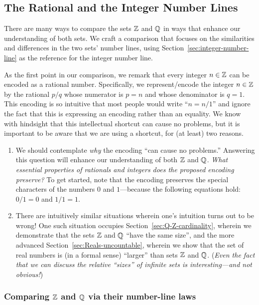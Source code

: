 \subsection{The Rational and the Integer Number Lines}
\label{sec:Compare-Q-Z}

There are many ways to compare the sets $\mathbb{Z}$ and $\mathbb{Q}$ in ways that
enhance our understanding of both sets.  We craft a comparison that
focuses on the similarities and differences in the two sets' number
lines, using Section~\ref{sec:integer-number-line} as the reference
for the integer number line.

As the first point in our comparison, we remark that every integer $n
\in \mathbb{Z}$ can be encoded as a rational 
number.  Specifically, we represent/encode the integer $n \in \mathbb{Z}$ by
the rational $p/q$ whose numerator is $p = n$ and whose denominator is
$q = 1$.  This encoding is so intuitive that most people would write
``$n = n/1$'' and ignore the fact that this is expressing an encoding
rather than an equality.  We know with hindsight that this
intellectual shortcut can cause no problems, but it is important to be
aware that we are using a shortcut, for (at least) two reasons.
\begin{enumerate}
\item
We should contemplate {\em why} the encoding ``can cause no
problems.''  Answering this question will enhance our understanding of
both $\mathbb{Z}$ and $\mathbb{Q}$.  {\em What essential properties of rationals and
  integers does the proposed encoding preserve?}  To get started, note
that the encoding preserves the special characters of the numbers $0$
and $1$---because the following equations hold: $0/1 = 0$ and $1/1 =
1$.

\item
There are intuitively similar situations wherein one's intuition turns
out to be wrong!  One such situation occupies
Section~\ref{sec:Q-Z-cardinality}, wherein we demonstrate that the
sets $\mathbb{Z}$ and $\mathbb{Q}$ ``have the same size'', and the more advanced
Section~\ref{sec:Reals-uncountable}, wherein we show that the set
of real numbers is (in a formal sense) ``larger'' than sets $\mathbb{Z}$ and
$\mathbb{Q}$.  ({\em Even the fact that we can discuss the relative ``sizes''
  of infinite sets is interesting---and not obvious!})
\end{enumerate}

\subsubsection{Comparing $\mathbb{Z}$ and $\mathbb{Q}$ via their number-line laws}
\label{sec:Q-Z-laws}

